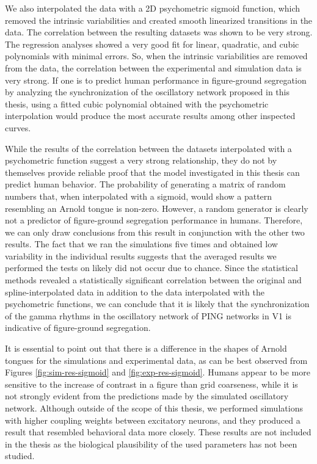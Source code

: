 We also interpolated the data with a 2D psychometric sigmoid function, which removed the intrinsic variabilities and created smooth linearized transitions in the data. The correlation between the resulting datasets was shown to be very strong. The regression analyses showed a very good fit for linear, quadratic, and cubic polynomials with minimal errors. So, when the intrinsic variabilities are removed from the data, the correlation between the experimental and simulation data is very strong.
If one is to predict human performance in figure-ground segregation by analyzing the synchronization of the oscillatory network proposed in this thesis, using a fitted cubic polynomial obtained with the psychometric interpolation would produce the most accurate results among other inspected curves.

While the results of the correlation between the datasets interpolated with a psychometric function suggest a very strong relationship, they do not by themselves provide reliable proof that the model investigated in this thesis can predict human behavior. The probability of generating a matrix of random numbers that, when interpolated with a sigmoid, would show a pattern resembling an Arnold tongue is non-zero.
However, a random generator is clearly not a predictor of figure-ground segregation performance in humans. Therefore, we can only draw conclusions from this result in conjunction with the other two results. The fact that we ran the simulations five times and obtained low variability in the individual results suggests that the averaged results we performed the tests on likely did not occur due to chance.
Since the statistical methods revealed a statistically significant correlation between the original and spline-interpolated data in addition to the data interpolated with the psychometric functions, we can conclude that it is likely that the synchronization of the gamma rhythms in the oscillatory network of PING networks in V1 is indicative of figure-ground segregation.

It is essential to point out that there is a difference in the shapes of Arnold tongues for the simulations and experimental data, as can be best observed from Figures \ref{fig:sim-res-sigmoid} and \ref{fig:exp-res-sigmoid}. Humans appear to be more sensitive to the increase of contrast in a figure than grid coarseness, while it is not strongly evident from the predictions made by the simulated oscillatory network. Although outside of the scope of this thesis, we performed simulations with higher coupling weights between excitatory neurons, and they produced a result that resembled behavioral data more closely. These results are not included in the thesis as the biological plausibility of the used parameters has not been studied.

